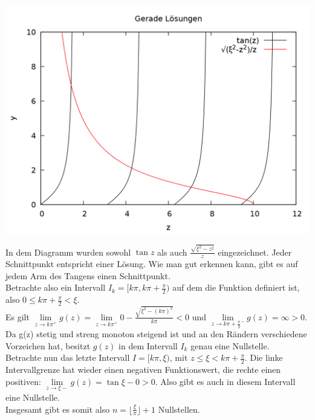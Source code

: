 \documentclass{scrartcl}
\begin{document}
\begin{center}
\includegraphics[scale=0.3]{plot_tan.png}
\end{center}

In dem Diagramm wurden sowohl $\tan z$ als auch $\frac{\sqrt{\xi^2-z^2}}{z}$ eingezeichnet. Jeder Schnittpunkt entspricht einer Lösung. Wie man gut erkennen kann, gibt es auf jedem Arm des Tangens einen Schnittpunkt.\\

Betrachte also ein Intervall $I_k = [k\pi, k\pi+\frac{\pi}{2})$ auf dem die Funktion definiert ist, also $0 \leq k\pi + \frac{\pi}{2} < \xi$.\\
Es gilt $\lim\limits_{z\to k\pi^+}{g(z)} = \lim\limits_{z\to k\pi^+}{0 - \frac{\sqrt{\xi^2-(k\pi)^2}}{k\pi}} < 0$ und $\lim\limits_{z\to k\pi+\frac{\pi}{2}^-}{g(z)} = \infty > 0$. Da g(z) stetig und streng monoton steigend ist und an den Rändern verschiedene Vorzeichen hat, besitzt $g(z)$ in dem Intervall $I_k$ genau eine Nullstelle.\\

Betrachte nun das letzte Intervall $I = [k\pi, \xi)$, mit $z \leq \xi < k\pi + \frac{\pi}{2}$. Die linke Intervallgrenze hat wieder einen negativen Funktionswert, die rechte einen positiven: $\lim\limits_{z\to \xi-}{g(z)} = \tan{\xi} - 0 > 0$.  Also gibt es auch in diesem Intervall eine Nullstelle.\\

Insgesamt gibt es somit also $n = \lfloor\frac{\xi}{\pi}\rfloor + 1$ Nullstellen.\\
\end{document}

